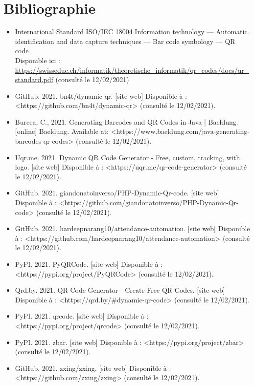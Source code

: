 \documentclass[a4paper,12pt]{article}
\begin{document}
\newpage

\section{Bibliographie}

\begin{itemize}

\item International Standard ISO/IEC 18004
Information technology — Automatic identification and data capture techniques — Bar code symbology — QR code\\
Disponible ici : \url{https://swisseduc.ch/informatik/theoretische\_informatik/qr\_codes/docs/qr\_standard.pdf} (consulté le 12/02/2021) \\

\item GitHub. 2021. bn4t/dynamic-qr. [site web] Disponible à : <https://github.com/bn4t/dynamic-qr> (consulté le 12/02/2021).\\
\item Burcea, C., 2021. Generating Barcodes and QR Codes in Java | Baeldung. [online] Baeldung. Available at: <https://www.baeldung.com/java-generating-barcodes-qr-codes> (consulté le 12/02/2021).\\
\item Uqr.me. 2021. Dynamic QR Code Generator - Free, custom, tracking, with logo. [site web] Disponible à : <https://uqr.me/qr-code-generator> (consulté le 12/02/2021).\\
\item GitHub. 2021. giandonatoinverso/PHP-Dynamic-Qr-code. [site web] Disponible à : <https://github.com/giandonatoinverso/PHP-Dynamic-Qr-code> (consulté le 12/02/2021).\\
\item GitHub. 2021. hardeepnarang10/attendance-automation. [site web] Disponible à : <https://github.com/hardeepnarang10/attendance-automation> (consulté le 12/02/2021).\\
\item PyPI. 2021. PyQRCode. [site web] Disponible à : <https://pypi.org/project/PyQRCode> (consulté le 12/02/2021).\\
\item Qrd.by. 2021. QR Code Generator - Create Free QR Codes. [site web] Disponible à : <https://qrd.by/#dynamic-qr-code> (consulté le 12/02/2021).\\
\item PyPI. 2021. qrcode. [site web] Disponible à : <https://pypi.org/project/qrcode> (consulté le 12/02/2021).\\
\item PyPI. 2021. zbar. [site web] Disponible à : <https://pypi.org/project/zbar> (consulté le 12/02/2021).\\
\item GitHub. 2021. zxing/zxing. [site web] Disponible à : <https://github.com/zxing/zxing> (consulté le 12/02/2021).\\




\end{itemize}
\end{document}
